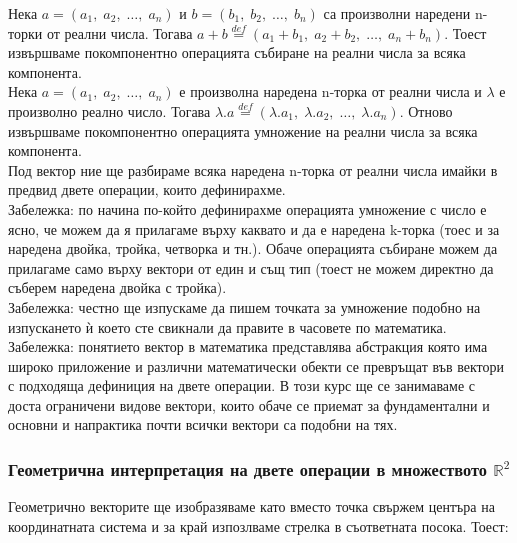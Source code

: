 \documentclass[12pt]{article}
\newcommand{\R}{\mathbb{R}}
\begin{document}
Нека $a = (a_1, \; a_2, \; \dots, \; a_n)$ и $b = (b_1, \; b_2, \; \dots, \; b_n)$ са произволни наредени n-торки от реални числа. Тогава
$a + b \overset{def}{=} (a_1 + b_1, \; a_2 + b_2, \; \dots, \; a_n + b_n)$. Тоест извършваме покомпонентно операцията събиране на реални числа за всяка компонента. \\

Нека $a = (a_1, \; a_2, \; \dots, \; a_n)$ е произволна наредена n-торка от реални числа и $\lambda$ е произволно реално число. Тогава
$\lambda.a \overset{def}{=} (\lambda.a_1, \; \lambda.a_2, \; \dots, \; \lambda.a_n)$. Отново извършваме покомпонентно операцията умножение на реални числа за всяка компонента. \\

Под вектор ние ще разбираме всяка наредена n-торка от реални числа имайки в предвид двете операции, които дефинирахме.\\

Забележка: по начина по-който дефинирахме операцията умножение с число е ясно, че можем да я прилагаме върху каквато и да е
наредена k-торка (тоес и за наредена двойка, тройка, четворка и тн.). Обаче операцията събиране можем да прилагаме само върху
вектори от един и същ тип (тоест не можем директно да съберем наредена двойка с тройка). \\

Забележка: честно ще изпускаме да пишем точката за умножение подобно на изпускането ѝ което сте свикнали да правите в часовете по математика. \\

Забележка: понятието вектор в математика представлява абстракция която има широко приложение и различни математически обекти се превръщат във вектори с подходяща
дефиниция на двете операции. В този курс ще се занимаваме с доста ограничени видове вектори, които обаче се приемат за фундаментални и основни и напрактика почти
всички вектори са подобни на тях.

\subsubsection*{Геометрична интерпретация на двете операции в множеството $\R^2$}

Геометрично векторите ще изобразяваме като вместо точка свържем центъра на координатната система и за край изпозлваме стрелка в съответната посока. Тоест:\\\\

 \\\\
  
\end{document}
